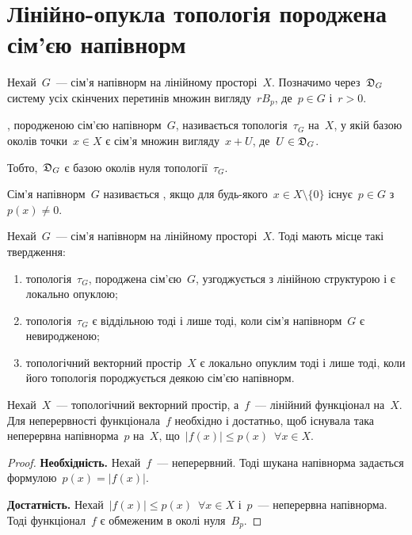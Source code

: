 \section{Лінійно-опукла топологія породжена сім'єю напівнорм}

\begin{definition}
    Нехай~$G$~--- сім'я напівнорм на лінійному просторі~$X$. Позначимо через~$\frak D_G$ систему усіх скінчених перетинів множин вигляду~$r B_p$, де~$p \in G$ і~$r > 0$.
    
    , породженою сім'єю напівнорм~$G$, називається топологія~$\tau_G$ на~$X$, у якій базою околів точки~$x \in X$ є сім'я множин вигляду~$x + U$, де~$U \in \frak D_G$.
\end{definition}

\begin{remark}
    Тобто,~$\frak D_G$ є базою околів нуля топології~$\tau_G$.
\end{remark}

\begin{definition}
    Сім'я напівнорм~$G$ називається , якщо для будь-якого~$x \in X \setminus \{0\}$ існує~$p \in G$ з~$p(x) \ne 0$.
\end{definition}

\begin{theorem}
    Нехай~$G$~--- сім'я напівнорм на лінійному просторі~$X$. Тоді мають місце такі твердження:
    \begin{enumerate}
        \item топологія~$\tau_G$, породжена сім'єю~$G$, узгоджується з лінійною структурою і є локально опуклою;
        \item топологія~$\tau_G$ є віддільною тоді і лише тоді, коли сім'я напівнорм~$G$ є невиродженою;
        \item топологічний векторний простір~$X$ є локально опуклим тоді і лише тоді, коли його топологія породжується деякою сім'єю напівнорм.
    \end{enumerate}
\end{theorem}

\begin{theorem}
    Нехай~$X$~--- топологічний векторний простір, а~$f$~--- лінійний функціонал на~$X$. Для неперервності функціонала~$f$ необхідно і достатньо, щоб існувала така неперервна напівнорма~$p$ на~$X$, що~$|f(x)| \le p(x)$~$\forall x \in X$.
\end{theorem}

\begin{proof}
    \textbf{Необхідність.} Нехай~$f$~--- неперервний. Тоді шукана напівнорма задається формулою~$p(x) = |f(x)|$.

    \textbf{Достатність.} Нехай~$|f(x)| \le p(x)$~$\forall x \in X$ і~$p$~--- неперервна напівнорма. Тоді функціонал~$f$ є обмеженим в околі нуля~$B_p$. 
\end{proof}

